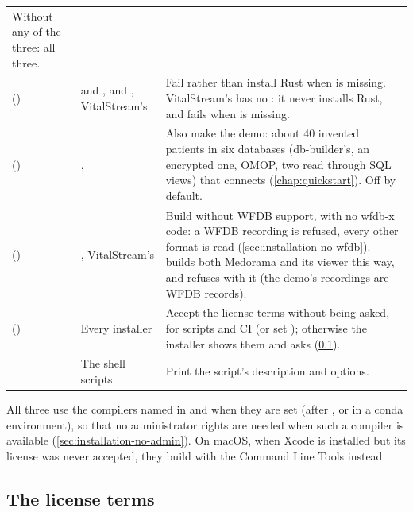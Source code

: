 \begin{xltabular}{\linewidth}{@{}P{3.4cm}P{2.6cm}L@{}}
  Without any of the three: all three. \\
 () &  and ,
   and , VitalStream's  & Fail rather than install
  Rust when  is missing. VitalStream's  has no : it
  never installs Rust, and  fails when  is missing. \\
 () & ,  & Also make the demo:
  about 40 invented patients in six databases (db-builder's, an encrypted one, OMOP, two read through SQL views)
  that  connects (\cref{chap:quickstart}). Off by default. \\
 () & , VitalStream's  & Build
  without WFDB support, with no wfdb-x code: a WFDB recording is refused, every other format is
  read (\cref{sec:installation-no-wfdb}).  builds both Medorama and its
  viewer this way, and refuses  with it (the demo's recordings are WFDB records). \\
 () & Every installer & Accept the license terms
  without being asked, for scripts and CI (or set );
  otherwise the installer shows them and asks (\cref{sec:installation-license}). \\
 & The shell scripts & Print the script's description and options. \\
\end{xltabular}

All three use the compilers named in  and  when they are set (after
, or in a conda environment), so that no administrator rights are needed
when such a compiler is available (\cref{sec:installation-no-admin}). On macOS, when Xcode is
installed but its license was never accepted, they build with the Command Line Tools instead.

\subsection{The license terms}
\label{sec:installation-license}

